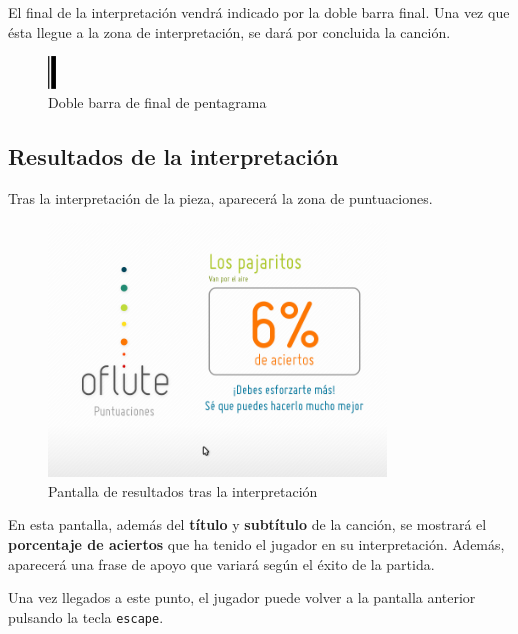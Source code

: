 El final de la interpretación vendrá indicado por la doble barra final. Una vez
que ésta llegue a la zona de interpretación, se dará por concluida la canción.

\begin{figure}[h!]
  \centering
  \includegraphics[width=0.02\textwidth]{apendice_manual_usuario/imagen_figFinal}
  \caption{Doble barra de final de pentagrama}
\end{figure}

\subsection{Resultados de la interpretación}
Tras la interpretación de la pieza, aparecerá la zona de puntuaciones.

\begin{figure}[h!]
  \centering
  \includegraphics[width=0.8\textwidth]{apendice_manual_usuario/imagen_seccionCanciones3}
  \caption{Pantalla de resultados tras la interpretación}
\end{figure}

En esta pantalla, además del \textbf{título} y \textbf{subtítulo} de la canción,
se mostrará el \textbf{porcentaje de aciertos} que ha tenido el jugador en su
interpretación. Además, aparecerá una frase de apoyo que variará según el éxito
de la partida.

Una vez llegados a este punto, el jugador puede volver a la pantalla anterior
pulsando la tecla \texttt{escape}.
